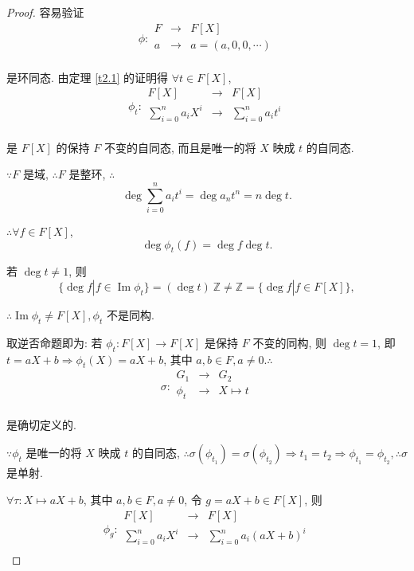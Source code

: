 \documentclass[UTF8]{ctexart}
\begin{document}
\begin{proof}
    容易验证
    \[\phi:\begin{array}{rcl}
        F & \to & F[X] \\
        a & \to & a=(a,0,0,\cdots) \\
    \end{array}\]

    是环同态. 由定理 \ref{t2.1} 的证明得 $\forall t\in F[X]$,
    \[\phi_t:\begin{array}{rcl}
        F[X] & \to & F[X] \\
        \sum\limits_{i=0}^{n}a_iX^i & \to & \sum\limits_{i=0}^{n}a_it^i \\
    \end{array}\]

    是 $F[X]$ 的保持 $F$ 不变的自同态, 而且是唯一的将 $X$ 映成 $t$ 的自同态.

    $\because F$ 是域, $\therefore F$ 是整环, $\therefore$
    \[\deg\sum\limits_{i=0}^{n}a_it^i=\deg a_nt^n=n\deg t.\]

    $\therefore\forall f\in F[X]$,
    \[\deg\phi_t(f)=\deg f\deg t.\]

    若 $\deg t\neq1$, 则
    \[\{\deg f|f\in\operatorname{Im}\phi_t\}=(\deg t)\ \mathbb{Z}\neq\mathbb{Z}=\{\deg f|f\in F[X]\},\]

    $\therefore\operatorname{Im}\phi_t\neq F[X],\phi_t$ 不是同构.

    取逆否命题即为: 若 $\phi_t:F[X]\to F[X]$ 是保持 $F$ 不变的同构, 则 $\deg t=1$, 即 $t=aX+b\Rightarrow\phi_t(X)=aX+b$, 其中 $a,b\in F,a\neq0.\therefore$
    \[\sigma:\begin{array}{rcl}
        G_1 & \to & G_2 \\
        \phi_t & \to & X\mapsto t \\
    \end{array}\]

    是确切定义的.

    $\because\phi_t$ 是唯一的将 $X$ 映成 $t$ 的自同态, $\therefore\sigma(\phi_{t_1})=\sigma(\phi_{t_2})\Rightarrow t_1=t_2\Rightarrow\phi_{t_1}=\phi_{t_2},\therefore\sigma$ 是单射.

    $\forall\tau:X\mapsto aX+b$, 其中 $a,b\in F,a\neq0$, 令 $g=aX+b\in F[X]$, 则
    \[\phi_g:\begin{array}{rcl}
        F[X] & \to & F[X] \\
        \sum\limits_{i=0}^{n}a_iX^i & \to & \sum\limits_{i=0}^{n}a_i(aX+b)^i \\
    \end{array}\]


\end{proof}
\end{document}
